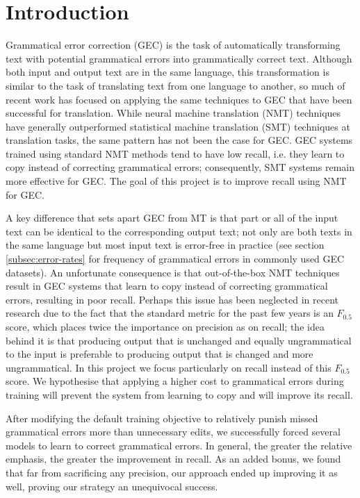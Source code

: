 \chapter{Introduction} \label{ch:intro}
Grammatical error correction (GEC) is the task of automatically transforming text with potential grammatical errors into grammatically correct text. Although both input and output text are in the same language, this transformation is similar to the task of translating text from one language to another, so much of recent work has focused on applying the same techniques to GEC that have been successful for translation. While neural machine translation (NMT) techniques have generally outperformed statistical machine translation (SMT) techniques at translation tasks, the same pattern has not been the case for GEC. GEC systems trained using standard NMT methods tend to have low recall, i.e. they learn to copy instead of correcting grammatical errors; consequently, SMT systems remain more effective for GEC. The goal of this project is to improve recall using NMT for GEC.

A key difference that sets apart GEC from MT is that part or all of the input text can be identical to the corresponding output text; not only are both texts in the same language but most input text is error-free in practice (see section \ref{subsec:error-rates} for frequency of grammatical errors in commonly used GEC datasets). An unfortunate consequence is that out-of-the-box NMT techniques result in GEC systems that learn to copy instead of correcting grammatical errors, resulting in poor recall. Perhaps this issue has been neglected in recent research due to the fact that the standard metric for the past few years is an $F_{0.5}$ score, which places twice the importance on precision as on recall; the idea behind it is that producing output that is unchanged and equally ungrammatical to the input is preferable to producing output that is changed and more ungrammatical. In this project we focus particularly on recall instead of this $F_{0.5}$ score. We hypothesise that applying a higher cost to grammatical errors during training will prevent the system from learning to copy and will improve its recall.

After modifying the default training objective to relatively punish missed grammatical errors more than unnecessary edits, we successfully forced several models to learn to correct grammatical errors. In general, the greater the relative emphasis, the greater the improvement in recall. As an added bonus, we found that far from sacrificing any precision, our approach ended up improving it as well, proving our strategy an unequivocal success.


